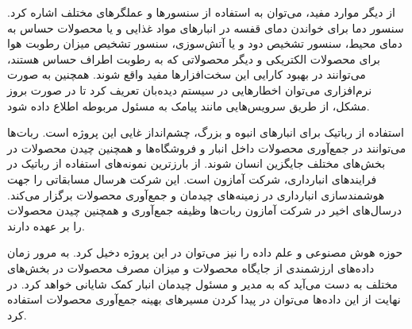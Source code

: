 از دیگر موارد مفید، می‌توان به استفاده از سنسورها و عملگرهای مختلف اشاره کرد. سنسور دما برای خواندن دمای قفسه در انبارهای مواد غذایی و یا محصولات حساس به دمای محیط، سنسور تشخیص دود و یا آتش‌سوزی، سنسور تشخیص میزان رطوبت هوا برای محصولات الکتریکی و دیگر محصولاتی که به رطوبت اطراف حساس هستند، می‌توانند در بهبود  کارایی این سخت‌افزارها مفید واقع شوند. همچنین به صورت نرم‌افزاری می‌توان اخطارهایی در سیستم دیده‌بان تعریف کرد تا در صورت بروز مشکل، از طریق سرویس‌هایی مانند پیامک به مسئول مربوطه اطلاع داده شود.

استفاده از رباتیک برای انبارهای انبوه و بزرگ، چشم‌انداز غایی این پروژه است. ربات‌ها می‌توانند در جمع‌آوری محصولات داخل انبار و فروشگاه‌ها و همچنین چیدن محصولات در بخش‌های مختلف جایگزین انسان شوند. از بارزترین نمونه‌های استفاده از رباتیک در فرایندهای انبارداری، شرکت آمازون است. این شرکت هرسال مسابقاتی را جهت هوشمندسازی انبارداری در زمینه‌های چیدمان و جمع‌آوری محصولات برگزار می‌کند. درسال‌های اخیر در شرکت آمازون ربات‌ها وظیفه جمع‌آوری و همچنین چیدن محصولات را بر عهده دارند\cite{Amazon}.

حوزه هوش مصنوعی و علم داده را نیز می‌توان در این پروژه دخیل کرد. به مرور زمان داده‌های ارزشمندی از جایگاه محصولات و میزان مصرف محصولات در بخش‌های مختلف به دست می‌آید که به مدیر و مسئول چیدمان انبار کمک شایانی خواهد کرد. در نهایت از این داده‌ها می‌توان در پیدا کردن مسیرهای بهینه جمع‌آوری محصولات استفاده کرد.